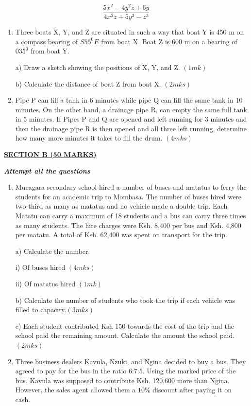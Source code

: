 \documentclass[
  a4paperpaper,
]{scrbook}
\begin{document}
\begin{tcolorbox}
\[ \frac{5x^2-4y^2z+6y}{4x^2z+5y^3-z^3}\]

\begin{enumerate}
\def\labelenumi{\arabic{enumi}.}
\setcounter{enumi}{13}
\item
  Three boats X, Y, and Z are situated in such a way that boat Y is 450
  m on a compass bearing of \(S55^0E\) from boat X. Boat Z is 600 m on a
  bearing of \(035^0\) from boat Y.

  a) Draw a sketch showing the positions of X, Y, and Z. \((1mk)\)

  b) Calculate the distance of boat Z from boat X. \((2mks)\)
\item
  Pipe P can fill a tank in 6 minutes while pipe Q can fill the same
  tank in 10 minutes. On the other hand, a drainage pipe R, can empty
  the same full tank in 5 minutes. If Pipes P and Q are opened and left
  running for 3 minutes and then the drainage pipe R is then opened and
  all three left running, determine how many more minutes it takes to
  fill the drum. \((4mks)\)
\end{enumerate}

\ul{\textbf{SECTION B (50 MARKS)}}

\textbf{\emph{Attempt all the questions}}

\begin{enumerate}
\def\labelenumi{\arabic{enumi}.}
\setcounter{enumi}{15}
\item
  Mucagara secondary school hired a number of buses and matatus to ferry
  the students for an academic trip to Mombasa. The number of buses
  hired were two-third as many as matatus and no vehicle made a double
  trip. Each Matatu can carry a maximum of 18 students and a bus can
  carry three times as many students. The hire charges were Ksh. 8,400
  per bus and Ksh. 4,800 per matatu. A total of Ksh. 62,400 was spent on
  transport for the trip.

  a) Calculate the number:

  i) Of buses hired \((4mks)\)

  ii) Of matatus hired \((1mk)\)

  b) Calculate the number of students who took the trip if each vehicle
  was filled to capacity.\((3mks)\)

  c) Each student contributed Ksh 150 towards the cost of the trip and
  the school paid the remaining amount. Calculate the amount the school
  paid. \((2mks)\)
\item
  Three business dealers Kavula, Nzuki, and Ngina decided to buy a bus.
  They agreed to pay for the bus in the ratio 6:7:5. Using the marked
  price of the bus, Kavula was supposed to contribute Ksh. 120,600 more
  than Ngina. However, the sales agent allowed them a \(10\%\) discount
  after paying it on cash.


\end{enumerate}
\end{tcolorbox}
\end{document}

